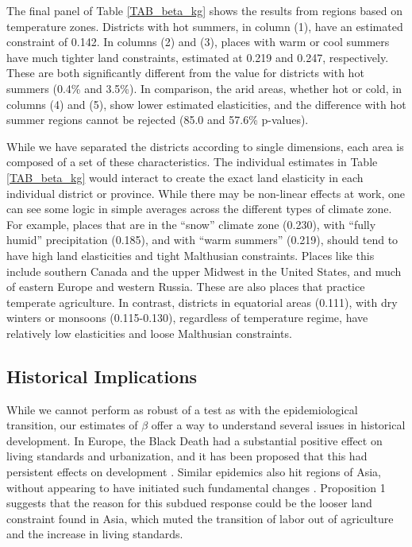 The final panel of Table \ref{TAB_beta_kg} shows the results from regions based on temperature zones. Districts with hot summers, in column (1), have an estimated constraint of 0.142. In columns (2) and (3), places with warm or cool summers have much tighter land constraints, estimated at 0.219 and 0.247, respectively. These are both significantly different from the value for districts with hot summers (0.4\% and 3.5\%). In comparison, the arid areas, whether hot or cold, in columns (4) and (5), show lower estimated elasticities, and the difference with hot summer regions cannot be rejected (85.0 and 57.6\% p-values).

While we have separated the districts according to single dimensions, each area is composed of a set of these characteristics. The individual estimates in Table \ref{TAB_beta_kg} would interact to create the exact land elasticity in each individual district or province. While there may be non-linear effects at work, one can see some logic in simple averages across the different types of climate zone. For example, places that are in the ``snow'' climate zone (0.230), with ``fully humid'' precipitation (0.185), and with ``warm summers'' (0.219), should tend to have high land elasticities and tight Malthusian constraints. Places like this include southern Canada and the upper Midwest in the United States, and much of eastern Europe and western Russia. These are also places that practice temperate agriculture. In contrast, districts in equatorial areas (0.111), with dry winters or monsoons (0.115-0.130), regardless of temperature regime, have relatively low elasticities and loose Malthusian constraints.

\subsection{Historical Implications}
While we cannot perform as robust of a test as with the epidemiological transition, our estimates of $\beta$ offer a way to understand several issues in historical development. In Europe, the Black Death had a substantial positive effect on living standards and urbanization, and it has been proposed that this had persistent effects on development \citep{vv08,vv13}. Similar epidemics also hit regions of Asia, without appearing to have initiated such fundamental changes \citep{McNeill1976}. Proposition 1 suggests that the reason for this subdued response could be the looser land constraint found in Asia, which muted the transition of labor out of agriculture and the increase in living standards. 


